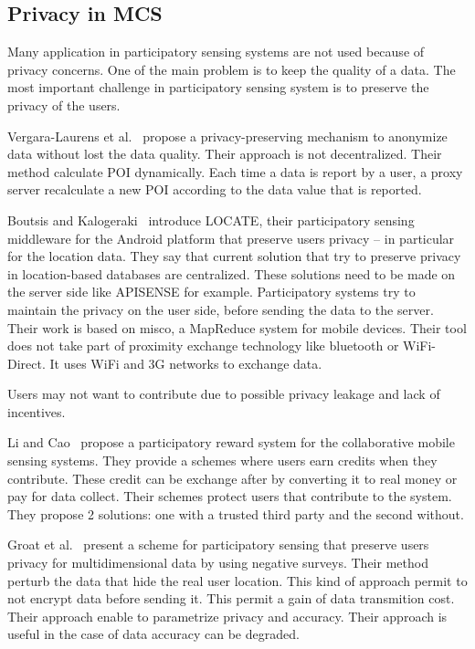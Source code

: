 \subsection{Privacy in MCS}


Many application in participatory sensing systems are not used because of privacy concerns. 
One of the main problem is to keep the quality of a data.
The most important challenge in participatory sensing system is to preserve the privacy of the users.

Vergara-Laurens et al.~\cite{DBLP:conf/percom/Vergara-LaurensML14} propose  a privacy-preserving mechanism to anonymize data without lost the data quality.
Their approach is not decentralized.
Their method calculate POI dynamically.
Each time a data is report by a user, a proxy server recalculate a new POI according to the data value that is reported.

Boutsis and Kalogeraki~\cite{DBLP:conf/percom/BoutsisK13} introduce LOCATE, their participatory sensing middleware for the Android platform that preserve users privacy -- in particular for the location data.
They say that current solution that try to preserve privacy in location-based databases are centralized.
These solutions need to be made on the server side like APISENSE for example.
Participatory systems try to maintain the privacy on the user side, before sending the data to the server.
Their work is based on misco, a MapReduce system for mobile devices.
Their tool does not take part of proximity exchange technology like bluetooth or WiFi-Direct.
It uses WiFi and 3G networks to exchange data.

%
Users may not want to contribute due to possible privacy leakage and lack of incentives.
%

Li and Cao~\cite{DBLP:conf/percom/LiC13} propose a participatory reward system for the collaborative mobile sensing systems.
They provide a schemes where users earn credits when they contribute.
These credit can be exchange after by converting it to real money or pay for data collect.
Their schemes protect users that contribute to the system.
They propose 2 solutions: one with a trusted third party and the second without.

Groat et al.~\cite{DBLP:conf/percom/GroatEHHF12} present a scheme for participatory sensing that preserve users privacy for multidimensional data by using negative surveys.
Their method perturb the data that hide the real user location.
This kind of approach permit to not encrypt data before sending it.
This permit a gain of data transmition cost.
Their approach enable to parametrize privacy and accuracy.
Their approach is useful in the case of data accuracy can be degraded.

